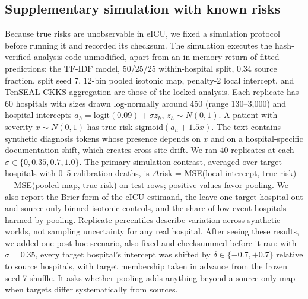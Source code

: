\documentclass[11pt]{article}
\begin{document}
\subsection*{Supplementary simulation with known risks}\label{simulation-methods}

Because true risks are unobservable in eICU, we fixed a simulation protocol before running it and recorded its checksum. The simulation executes the hash-verified analysis code unmodified, apart from an in-memory return of fitted predictions: the TF-IDF model, 50/25/25 within-hospital split, 0.34 source fraction, split seed 7, 12-bin pooled isotonic map, penalty-2 local intercept, and TenSEAL CKKS aggregation are those of the locked analysis. Each replicate has 60 hospitals with sizes drawn log-normally around 450 (range 130--3,000) and hospital intercepts $a_h=\mathrm{logit}(0.09)+\sigma z_h$, $z_h\sim N(0,1)$. A patient with severity $x\sim N(0,1)$ has true risk $\mathrm{sigmoid}(a_h+1.5x)$. The text contains synthetic diagnosis tokens whose presence depends on $x$ and on a hospital-specific documentation shift, which creates cross-site drift. We ran 40 replicates at each $\sigma\in\{0,0.35,0.7,1.0\}$. The primary simulation contrast, averaged over target hospitals with 0--5 calibration deaths, is $\Delta$risk = MSE(local intercept, true risk) $-$ MSE(pooled map, true risk) on test rows; positive values favor pooling. We also report the Brier form of the eICU estimand, the leave-one-target-hospital-out and source-only binned-isotonic controls, and the share of low-event hospitals harmed by pooling. Replicate percentiles describe variation across synthetic worlds, not sampling uncertainty for any real hospital. After seeing these results, we added one post hoc scenario, also fixed and checksummed before it ran: with $\sigma=0.35$, every target hospital's intercept was shifted by $\delta\in\{-0.7,+0.7\}$ relative to source hospitals, with target membership taken in advance from the frozen seed-7 shuffle. It asks whether pooling adds anything beyond a source-only map when targets differ systematically from sources.
\end{document}
